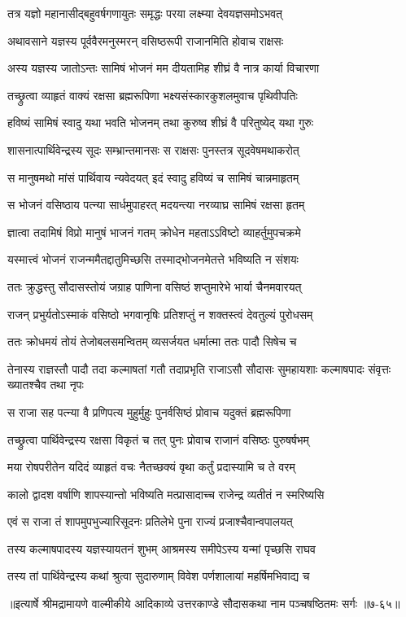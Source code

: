\twolineshloka
{तत्र यज्ञो महानासीद्बहुवर्षगणायुतः}
{समृद्धः परया लक्ष्म्या देवयज्ञसमोऽभवत्} %

\twolineshloka
{अथावसाने यज्ञस्य पूर्ववैरमनुस्मरन्}
{वसिष्ठरूपी राजानमिति होवाच राक्षसः} %

\twolineshloka
{अस्य यज्ञस्य जातोऽन्तः सामिषं भोजनं मम}
{दीयतामिह शीघ्रं वै नात्र कार्या विचारणा} %

\twolineshloka
{तच्छ्रुत्वा व्याहृतं वाक्यं रक्षसा ब्रह्मरूपिणा}
{भक्ष्यसंस्कारकुशलमुवाच पृथिवीपतिः} %

\twolineshloka
{हविष्यं सामिषं स्वादु यथा भवति भोजनम्}
{तथा कुरुष्व शीघ्रं वै परितुष्येद् यथा गुरुः} %

\twolineshloka
{शासनात्पार्थिवेन्द्रस्य सूदः सम्भ्रान्तमानसः}
{स राक्षसः पुनस्तत्र सूदवेषमथाकरोत्} %

\twolineshloka
{स मानुषमथो मांसं पार्थिवाय न्यवेदयत्}
{इदं स्वादु हविष्यं च सामिषं चान्नमाहृतम्} %

\twolineshloka
{स भोजनं वसिष्ठाय पत्न्या सार्धमुपाहरत्}
{मदयन्त्या नरव्याघ्र सामिषं रक्षसा हृतम्} %

\twolineshloka
{ज्ञात्वा तदामिषं विप्रो मानुषं भाजनं गतम्}
{क्रोधेन महताऽऽविष्टो व्याहर्तुमुपचक्रमे} %

\twolineshloka
{यस्मात्त्वं भोजनं राजन्ममैतद्दातुमिच्छसि}
{तस्माद्भोजनमेतत्ते भविष्यति न संशयः} %

\twolineshloka
{ततः क्रुद्धस्तु सौदासस्तोयं जग्राह पाणिना}
{वसिष्ठं शप्तुमारेभे भार्या चैनमवारयत्} %

\twolineshloka
{राजन् प्रभुर्यतोऽस्माकं वसिष्ठो भगवानृषिः}
{प्रतिशप्तुं न शक्तस्त्वं देवतुल्यं पुरोधसम्} %

\twolineshloka
{ततः क्रोधमयं तोयं तेजोबलसमन्वितम्}
{व्यसर्जयत धर्मात्मा ततः पादौ सिषेच च} %

\threelineshloka
{तेनास्य राज्ञस्तौ पादौ तदा कल्माषतां गतौ}
{तदाप्रभृति राजाऽसौ सौदासः सुमहायशाः}
{कल्माषपादः संवृत्तः ख्यातश्चैव तथा नृपः} %

\twolineshloka
{स राजा सह पत्न्या वै प्रणिपत्य मुहुर्मुहुः}
{पुनर्वसिष्ठं प्रोवाच यदुक्तं ब्रह्मरूपिणा} %

\twolineshloka
{तच्छ्रुत्वा पार्थिवेन्द्रस्य रक्षसा विकृतं च तत्}
{पुनः प्रोवाच राजानं वसिष्ठः पुरुषर्षभम्} %

\twolineshloka
{मया रोषपरीतेन यदिदं व्याहृतं वचः}
{नैतच्छक्यं वृथा कर्तुं प्रदास्यामि च ते वरम्} %

\twolineshloka
{कालो द्वादश वर्षाणि शापस्यान्तो भविष्यति}
{मत्प्रासादाच्च राजेन्द्र व्यतीतं न स्मरिष्यसि} %

\twolineshloka
{एवं स राजा तं शापमुपभुज्यारिसूदनः}
{प्रतिलेभे पुना राज्यं प्रजाश्चैवान्वपालयत्} %

\twolineshloka
{तस्य कल्माषपादस्य यज्ञस्यायतनं शुभम्}
{आश्रमस्य समीपेऽस्य यन्मां पृच्छसि राघव} %

\twolineshloka
{तस्य तां पार्थिवेन्द्रस्य कथां श्रुत्वा सुदारुणाम्}
{विवेश पर्णशालायां महर्षिमभिवाद्य च} %


॥इत्यार्षे श्रीमद्रामायणे वाल्मीकीये आदिकाव्ये उत्तरकाण्डे सौदासकथा नाम पञ्चषष्ठितमः सर्गः ॥७-६५॥
